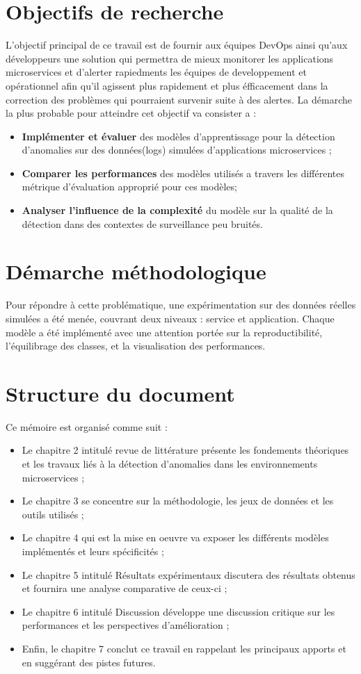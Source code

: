 \documentclass[a4paper,12pt]{report}
\begin{document}
\section{Objectifs de recherche}
L'objectif principal de ce travail est de fournir aux équipes DevOps ainsi qu'aux développeurs une solution qui permettra de mieux monitorer les applications microservices et d'alerter rapiedments les équipes de developpement et opérationnel afin qu'il agissent plus rapidement et plus éfficacement dans la correction des problèmes qui pourraient survenir suite à des alertes. La démarche la plus probable pour atteindre cet objectif va consister a :
\begin{itemize}
    \item \textbf{Implémenter et évaluer} des modèles d’apprentissage pour la détection d’anomalies sur des données(logs) simulées d’applications microservices ;
    \item \textbf{Comparer les performances} des modèles utilisés a travers les différentes métrique d'évaluation approprié pour ces modèles;
    \item \textbf{Analyser l’influence de la complexité} du modèle sur la qualité de la détection dans des contextes de surveillance peu bruités.
\end{itemize}

\section{Démarche méthodologique}
Pour répondre à cette problématique, une expérimentation sur des données réelles simulées a été menée, couvrant deux niveaux : service et application. Chaque modèle a été implémenté avec une attention portée sur la reproductibilité, l’équilibrage des classes, et la visualisation des performances.

\section{Structure du document}
Ce mémoire est organisé comme suit :
\begin{itemize}
    \item Le chapitre 2 intitulé revue de littérature présente les fondements théoriques et les travaux liés à la détection d’anomalies dans les environnements microservices ;
    \item Le chapitre 3 se concentre sur la méthodologie, les jeux de données et les outils utilisés ;
    \item Le chapitre 4 qui est la mise en oeuvre va exposer les différents modèles implémentés et leurs spécificités ;
    \item Le chapitre 5 intitulé Résultats expérimentaux discutera des résultats obtenus et fournira une analyse comparative de ceux-ci ;
    \item Le chapitre 6 intitulé Discussion développe une discussion critique sur les performances et les perspectives d’amélioration ;
    \item Enfin, le chapitre 7 conclut ce travail en rappelant les principaux apports et en suggérant des pistes futures.
\end{itemize}
\end{document}
